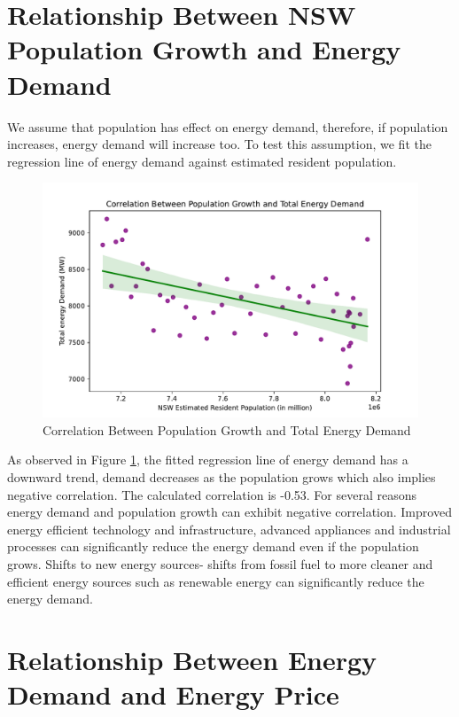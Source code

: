 \documentclass[mstat,12pt]{unswthesis}
\begin{document}
\hypertarget{relationship-between-nsw-population-growth-and-energy-demand}{%
\section{Relationship Between NSW Population Growth and Energy
Demand}\label{relationship-between-nsw-population-growth-and-energy-demand}}

We assume that population has effect on energy demand, therefore, if
population increases, energy demand will increase too. To test this
assumption, we fit the regression line of energy demand against
estimated resident population.

\begin{figure}[H]
\includegraphics[width=1\linewidth,]{ZZSC9020_Group_Report_files/figure-latex/plot-demand-vs-population-5} \caption{Correlation Between Population Growth and Total Energy Demand}\label{fig:plot-demand-vs-population}
\end{figure}

As observed in Figure \ref{fig:plot-demand-vs-population}, the fitted
regression line of energy demand has a downward trend, demand decreases
as the population grows which also implies negative correlation. The
calculated correlation is -0.53. For several reasons energy demand and
population growth can exhibit negative correlation. Improved energy
efficient technology and infrastructure, advanced appliances and
industrial processes can significantly reduce the energy demand even if
the population grows. Shifts to new energy sources- shifts from fossil
fuel to more cleaner and efficient energy sources such as renewable
energy can significantly reduce the energy demand.

\hypertarget{relationship-between-energy-demand-and-energy-price}{%
\section{Relationship Between Energy Demand and Energy
Price}\label{relationship-between-energy-demand-and-energy-price}}
\end{document}
